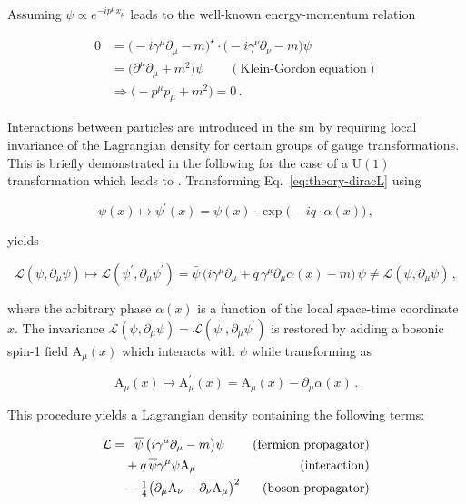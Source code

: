 Assuming $\psi\propto e^{-ip^{\mu}x_{\mu}}$ leads to the well-known energy-momentum relation

\begin{subequations}
\begin{align}
0&=\big(-i\gamma^\mu\partial_\mu-m\big)^\star\cdot \big(-i\gamma^\nu\partial_\nu-m\big)\psi\\
 &=\big(\partial^{\mu}\partial_{\mu}+m^{2}\big)\psi \qquad \mathrm{(Klein\mbox{-}Gordon~equation)}  \\
 &\Rightarrow \big(-p^{\mu}p_{\mu}+m^{2}\big) = 0\,.
\end{align}
\end{subequations}

Interactions between particles are introduced in the \gls{sm} by requiring local invariance of the Lagrangian density for certain groups of gauge transformations. This is briefly demonstrated in the following for the case of a $\mathrm{U(1)}$ transformation which leads to . Transforming Eq.~\ref{eq:theory-diracL} using 

\begin{equation}
\psi(x)\mapsto\psi^{\prime}(x)=\psi(x)\cdot\exp\big(-iq\cdot\alpha(x)\big)\,, \label{eq:theory-u1-trafo}
\end{equation}

yields

\begin{equation}
\mathcal{L}(\psi,\partial_\mu\psi)\mapsto\mathcal{L}(\psi^{\prime},\partial_\mu\psi^{\prime})=\bar{\psi}\,\Big(i\gamma^\mu\partial_\mu+q\,\gamma^\mu\partial_\mu\alpha(x)-m\Big)\,\psi\not=\mathcal{L}(\psi,\partial_\mu\psi)\,,
\end{equation}

where the arbitrary phase $\alpha(x)$ is a function of the local space-time coordinate $x$. The invariance $\mathcal{L}(\psi,\partial_\mu\psi)=\mathcal{L}(\psi^{\prime},\partial_\mu\psi^{\prime})$ is restored by adding a bosonic spin-1 field $\mathrm{A}_{\mu}(x)$ which interacts with $\psi$ while transforming as

\begin{equation}
\mathrm{A}_{\mu}(x)\mapsto \mathrm{A}^{\prime}_{\mu}(x)=\mathrm{A}_\mu(x)-\partial_\mu\alpha(x)\,.
\end{equation}

This procedure yields a Lagrangian density containing the following terms:

\begin{subequations}
\begin{align}
\mathcal{L}=&\hphantom{+}\bar{\psi}\,\big(i\gamma^\mu\partial_\mu-m\big)\psi &(\mathrm{fermion~propagator}) \\
            &+q\,\bar{\psi}\gamma^{\mu}\psi \mathrm{A}_{\mu} &(\mathrm{interaction}) \label{eq:theory-EM-int}\\
            &-\tfrac{1}{4}\big(\partial_\mu \mathrm{A}_\nu-\partial_\nu \mathrm{A}_\mu\big)^{2} &(\mathrm{boson~propagator})
\end{align}
\end{subequations}

